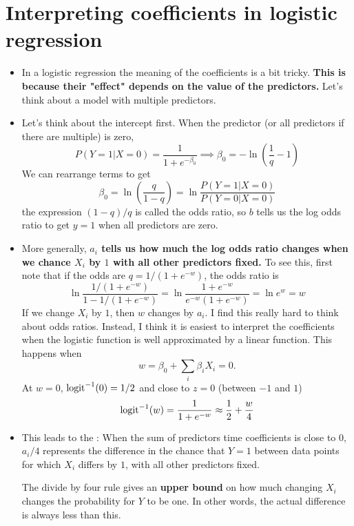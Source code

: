 \section{Interpreting coefficients in logistic regression}

\begin{itemize}
\item In a logistic regression the meaning of the coefficients is a bit tricky. {\bf This is because their "effect" depends on the value of the predictors.} Let's think about a model with multiple predictors.
\item Let's think about the intercept first. When the predictor (or all predictors if there are multiple) is zero, 
\begin{equation}
P(Y=1|X=0) = \frac{1}{1 + e^{-\beta_0}}\implies \beta_0 = - \ln\left(\frac{1}{q} -1 \right)
\end{equation}
We can rearrange terms to get
\begin{equation}
\beta_0 = \ln \left(\frac{q}{1-q} \right) = \ln \frac{P(Y=1|X=0)}{P(Y=0|X=0)}
\end{equation}
the expression $(1-q)/q$ is called the odds ratio, so $b$ tells us the log odds ratio to get $y=1$ when all predictors are zero. 
\item More generally, {\bf $a_i$ tells us how much the log odds ratio changes when we chance $X_i$ by $1$ with all other predictors fixed.} To see this, first note that if the odds are $q = 1/(1+e^{-w})$, the odds ratio is 
\begin{equation}
\ln \frac{1/(1+e^{-w})}{1-1/(1+e^{-w})} = \ln \frac{1+e^{-w}}{e^{-w}(1+e^{-w})}  = \ln e^w = w
\end{equation}
If we change $X_i$ by $1$, then $w$ changes by $a_i$. 
I find this really hard to think about odds ratios.  Instead, I think it is easiest to interpret the coefficients when the logistic function is well approximated by a linear function.  This happens when 
\begin{equation}
w= \beta_0 + \sum_i \beta_iX_i =0.
\end{equation}
 At $w=0$, ${\rm logit}^{-1}(0) =1/2$ and  close to $z=0$ (between $-1$ and $1$)
\begin{equation}
{\rm logit}^{-1}(w) = \frac{1}{1+e^{-w}} \approx \frac{1}{2} + \frac{w}{4}
\end{equation}

\item This leads to the : When the sum of predictors time coefficients is close to $0$, $a_i/4$ represents the difference in the chance that $Y=1$ between data points for which $X_i$ differs by $1$, with all other predictors fixed.

 The divide by four rule gives an {\bf upper bound} on how much changing $X_i$ changes the probability for $Y$ to be one. In other words, the actual difference is always less than this. 
 \end{itemize}
 
